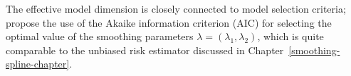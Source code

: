 \bigskip

The effective model dimension is closely connected to model selection criteria; \cite{eilers1996flexible} propose the use of the Akaike information criterion (AIC) for selecting the optimal value of the smoothing parameters $\lambda = \left(\lambda_1, \lambda_2\right)$, which is quite comparable to the unbiased risk estimator discussed in Chapter~\ref{smoothing-spline-chapter}.



